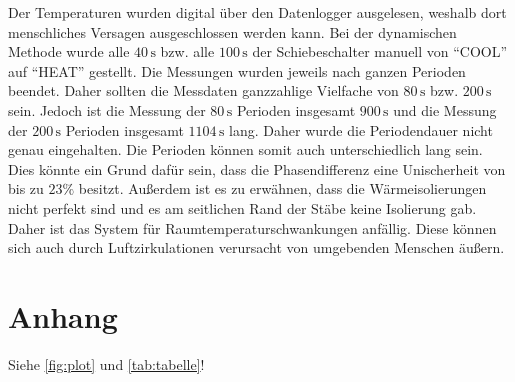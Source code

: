 Der Temperaturen wurden digital über den Datenlogger ausgelesen, weshalb dort menschliches Versagen ausgeschlossen werden kann.
Bei der dynamischen Methode wurde alle $40\,\unit{\second}$ bzw. alle $100\,\unit{\second}$ der Schiebeschalter manuell
von \enquote{COOL} auf \enquote{HEAT} gestellt. Die Messungen wurden jeweils nach ganzen Perioden beendet. Daher sollten die 
Messdaten ganzzahlige Vielfache von $80\,\unit{\second}$ bzw. $200\,\unit{\second}$ sein. Jedoch ist die Messung der 
$80\,\unit{\second}$ Perioden insgesamt $900\,\unit{\second}$ und die Messung der $200\,\unit{\second}$ Perioden insgesamt 
$1104\,\unit{\second}$ lang.
Daher wurde die Periodendauer nicht genau eingehalten. Die Perioden können somit auch unterschiedlich lang sein.
Dies könnte ein Grund dafür sein, dass die Phasendifferenz eine Unischerheit von bis zu $23{\%}$ besitzt.
Außerdem ist es zu erwähnen, dass die Wärmeisolierungen nicht perfekt sind und es am seitlichen Rand der Stäbe keine
Isolierung gab. Daher ist das System für Raumtemperaturschwankungen anfällig. Diese können sich auch durch Luftzirkulationen 
verursacht von umgebenden Menschen äußern.


\section{Anhang}
Siehe \autoref{fig:plot} und \autoref{tab:tabelle}!


